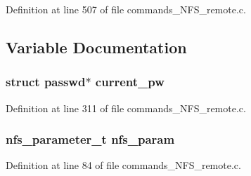 Definition at line 507 of file commands\_\-NFS\_\-remote.c.

\subsection{Variable Documentation}
\subsubsection[{current\_\-pw}]{\setlength{\rightskip}{0pt plus 5cm}struct passwd$\ast$ {\bf current\_\-pw}}\label{commands__NFS__remote_8c_a201fd5c4cfc080ec5f144d05be5531b4}


Definition at line 311 of file commands\_\-NFS\_\-remote.c.
\subsubsection[{nfs\_\-param}]{\setlength{\rightskip}{0pt plus 5cm}nfs\_\-parameter\_\-t {\bf nfs\_\-param}}\label{commands__NFS__remote_8c_aeb8fc46586993cf210777049fca03969}


Definition at line 84 of file commands\_\-NFS\_\-remote.c.
